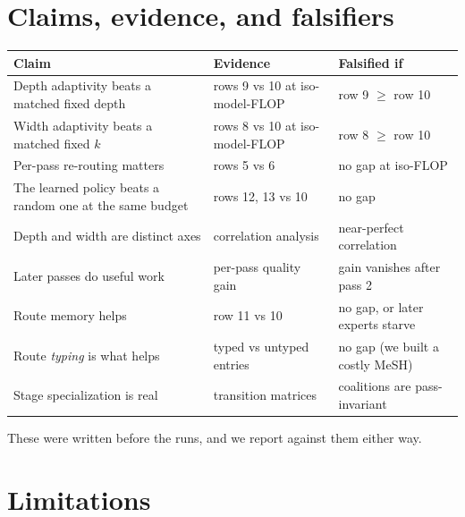 \documentclass[11pt]{article}
\begin{document}
\section{Claims, evidence, and falsifiers}

\begin{center}
\begin{tabular}{p{}p{}p{}}
\toprule
Claim & Evidence & Falsified if \\
\midrule
Depth adaptivity beats a matched fixed depth & rows 9 vs 10 at iso-model-FLOP & row 9 $\geq$ row 10 \\
Width adaptivity beats a matched fixed $k$ & rows 8 vs 10 at iso-model-FLOP & row 8 $\geq$ row 10 \\
Per-pass re-routing matters & rows 5 vs 6 & no gap at iso-FLOP \\
The learned policy beats a random one at the same budget & rows 12, 13 vs 10 & no gap \\
Depth and width are distinct axes & correlation analysis & near-perfect correlation \\
Later passes do useful work & per-pass quality gain & gain vanishes after pass 2 \\
Route memory helps & row 11 vs 10 & no gap, or later experts starve \\
Route \emph{typing} is what helps & typed vs untyped entries & no gap (we built a costly MeSH) \\
Stage specialization is real & transition matrices & coalitions are pass-invariant \\
\bottomrule
\end{tabular}
\end{center}

These were written before the runs, and we report against them either way.

\section{Limitations}
\label{sec:limitations}
\end{document}
